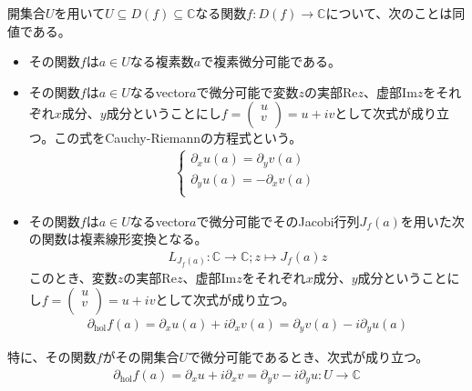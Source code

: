 \documentclass[dvipdfmx]{jsarticle}
\begin{document}
\begin{thm}\label{4.2.8.3}
開集合$U$を用いて$U \subseteq D(f) \subseteq \mathbb{C}$なる関数$f:D(f) \rightarrow \mathbb{C}$について、次のことは同値である。
\begin{itemize}
\item
  その関数$f$は$a \in U$なる複素数$a$で複素微分可能である。
\item
  その関数$f$は$a \in U$なるvector$a$で微分可能で変数$z$の実部$\mathrm{Re}z$、虚部$\mathrm{Im}z$をそれぞれ$x$成分、$y$成分ということにし$f = \begin{pmatrix}
  u \\
  v \\
  \end{pmatrix} = u + iv$として次式が成り立つ。この式をCauchy-Riemannの方程式という。
\begin{align*}
\left\{ \begin{matrix}
\partial_{x}u(a) = \partial_{y}v(a) \\
\partial_{y}u(a) = - \partial_{x}v(a) \\
\end{matrix} \right.\ 
\end{align*}
\item
  その関数$f$は$a \in U$なるvector$a$で微分可能でそのJacobi行列$J_{f}(a)$を用いた次の関数は複素線形変換となる。
\begin{align*}
L_{J_{f}(a)}:\mathbb{C} \rightarrow \mathbb{C};z \mapsto J_{f}(a)z
\end{align*}
このとき、変数$z$の実部$\mathrm{Re}z$、虚部$\mathrm{Im}z$をそれぞれ$x$成分、$y$成分ということにし$f = \begin{pmatrix}
u \\
v \\
\end{pmatrix} = u + iv$として次式が成り立つ。
\begin{align*}
\partial_{\mathrm{hol}}f(a) = \partial_{x}u(a) + i\partial_{x}v(a) = \partial_{y}v(a) - i\partial_{y}u(a)
\end{align*}
\end{itemize}\par
特に、その関数$f$がその開集合$U$で微分可能であるとき、次式が成り立つ。
\begin{align*}
\partial_{\mathrm{hol}}f(a) = \partial_{x}u + i\partial_{x}v = \partial_{y}v - i\partial_{y}u:U \rightarrow \mathbb{C}
\end{align*}
\end{thm}
\end{document}
